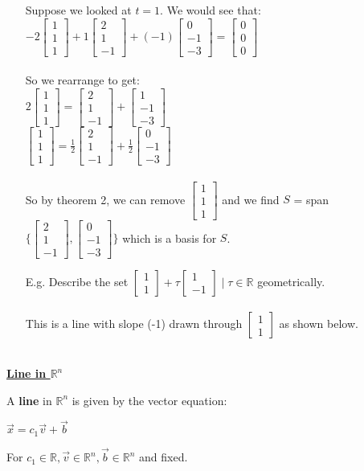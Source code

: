 \documentclass{letter}
\newcommand{\0}[1]{\begin{bmatrix}#1\end{bmatrix}}
\newcommand{\h}[1]{\underline{\textbf{#1}}}
\begin{document}
\begin{itemize}
		Suppose we looked at $t=1$. We would see that:\\
		$-2\0{1\\1\\1} + 1\0{2\\1\\-1} + (-1)\0{0\\-1\\-3} = \0{0\\0\\0}$\\\\
		So we rearrange to get:\\
		$2\0{1\\1\\1} = \0{2\\1\\-1} + \0{1\\-1\\-3}$\\
		$\0{1\\1\\1} = \frac12 \0{2\\1\\-1} + \frac12 \0{0\\-1\\-3}\;\;\;\;$\\\\
		So by theorem 2, we can remove $\0{1\\1\\1}$ and we find $S$ = span$\{ \0{2\\1\\-1}, \0{0\\-1\\-3} \}$ which is a basis for $S$.
		\item[E.g. ] Describe the set $\0{1\\1} + \tau\0{1\\-1} \mid \tau \in \mathbb{R}$ geometrically.\\\\
		This is a line with slope (-1) drawn through $\0{1\\1}$ as shown below.\\\\
		
		\begin{center}
		\end{center}
	\end{itemize}
	
	\h{Line in $\mathbb{R}^n$}
			
	A \textbf{line} in $\mathbb{R}^n$ is given by the vector equation:
	
	$\vec x = c_1 \vec v + \vec b$
	
	For $c_1 \in \mathbb{R}, \vec v \in \mathbb{R}^n, \vec b \in \mathbb{R}^n$ and fixed.
\end{document}
